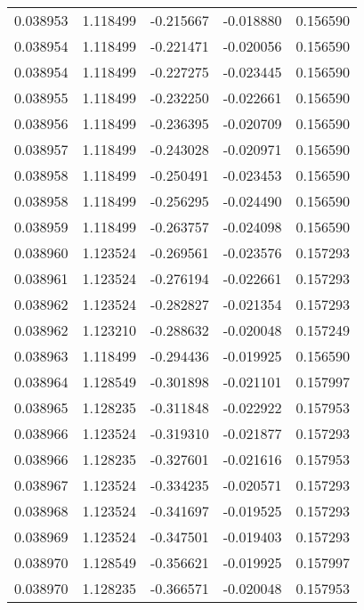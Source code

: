 \begin{tabular}{lrrrr}
0.038953    &  1.118499 & -0.215667 & -0.018880 &             0.156590 \\
0.038954    &  1.118499 & -0.221471 & -0.020056 &             0.156590 \\
0.038954    &  1.118499 & -0.227275 & -0.023445 &             0.156590 \\
0.038955    &  1.118499 & -0.232250 & -0.022661 &             0.156590 \\
0.038956    &  1.118499 & -0.236395 & -0.020709 &             0.156590 \\
0.038957    &  1.118499 & -0.243028 & -0.020971 &             0.156590 \\
0.038958    &  1.118499 & -0.250491 & -0.023453 &             0.156590 \\
0.038958    &  1.118499 & -0.256295 & -0.024490 &             0.156590 \\
0.038959    &  1.118499 & -0.263757 & -0.024098 &             0.156590 \\
0.038960    &  1.123524 & -0.269561 & -0.023576 &             0.157293 \\
0.038961    &  1.123524 & -0.276194 & -0.022661 &             0.157293 \\
0.038962    &  1.123524 & -0.282827 & -0.021354 &             0.157293 \\
0.038962    &  1.123210 & -0.288632 & -0.020048 &             0.157249 \\
0.038963    &  1.118499 & -0.294436 & -0.019925 &             0.156590 \\
0.038964    &  1.128549 & -0.301898 & -0.021101 &             0.157997 \\
0.038965    &  1.128235 & -0.311848 & -0.022922 &             0.157953 \\
0.038966    &  1.123524 & -0.319310 & -0.021877 &             0.157293 \\
0.038966    &  1.128235 & -0.327601 & -0.021616 &             0.157953 \\
0.038967    &  1.123524 & -0.334235 & -0.020571 &             0.157293 \\
0.038968    &  1.123524 & -0.341697 & -0.019525 &             0.157293 \\
0.038969    &  1.123524 & -0.347501 & -0.019403 &             0.157293 \\
0.038970    &  1.128549 & -0.356621 & -0.019925 &             0.157997 \\
0.038970    &  1.128235 & -0.366571 & -0.020048 &             0.157953 \\

\end{tabular}
